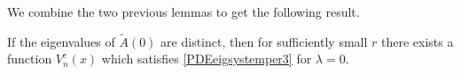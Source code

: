 \documentclass[thesis.tex]{subfiles}
\begin{document}
We combine the two previous lemmas to get the following result.

\begin{lemma}\label{lemma:centereigenfn}
If the eigenvalues of $\tilde{A}(0)$ are distinct, then for sufficiently small $r$ there exists a function $V_n^c(x)$ which satisfies \cref{PDEeigsystemper3} for $\lambda = 0$.
\end{lemma}

\iffulldocument\else
	
	
\fi
\end{document}
